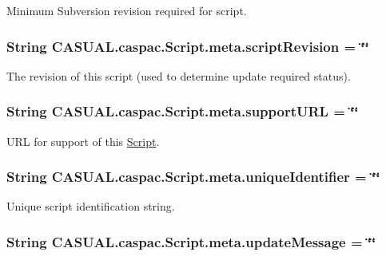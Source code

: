 Minimum Subversion revision required for script. \hypertarget{class_c_a_s_u_a_l_1_1caspac_1_1_script_1_1meta_a57752ff86ad97dc0123eaae1555dbfd5}{
\subsubsection[{script\-Revision}]{\setlength{\rightskip}{0pt plus 5cm}String C\-A\-S\-U\-A\-L.\-caspac.\-Script.\-meta.\-script\-Revision = \char`\"{}\char`\"{}}}\label{class_c_a_s_u_a_l_1_1caspac_1_1_script_1_1meta_a57752ff86ad97dc0123eaae1555dbfd5}
The revision of this script (used to determine update required status). \hypertarget{class_c_a_s_u_a_l_1_1caspac_1_1_script_1_1meta_ac61f54a156af56a97ddebc1b97c6de02}{
\subsubsection[{support\-U\-R\-L}]{\setlength{\rightskip}{0pt plus 5cm}String C\-A\-S\-U\-A\-L.\-caspac.\-Script.\-meta.\-support\-U\-R\-L = \char`\"{}\char`\"{}}}\label{class_c_a_s_u_a_l_1_1caspac_1_1_script_1_1meta_ac61f54a156af56a97ddebc1b97c6de02}
U\-R\-L for support of this \hyperlink{class_c_a_s_u_a_l_1_1caspac_1_1_script}{Script}. \hypertarget{class_c_a_s_u_a_l_1_1caspac_1_1_script_1_1meta_a66b81ac4a19e9bcd67f13776d05c03e9}{
\subsubsection[{unique\-Identifier}]{\setlength{\rightskip}{0pt plus 5cm}String C\-A\-S\-U\-A\-L.\-caspac.\-Script.\-meta.\-unique\-Identifier = \char`\"{}\char`\"{}}}\label{class_c_a_s_u_a_l_1_1caspac_1_1_script_1_1meta_a66b81ac4a19e9bcd67f13776d05c03e9}
Unique script identification string. \hypertarget{class_c_a_s_u_a_l_1_1caspac_1_1_script_1_1meta_a0a8a286ab3eb83b8a208b20f43ae4f79}{
\subsubsection[{update\-Message}]{\setlength{\rightskip}{0pt plus 5cm}String C\-A\-S\-U\-A\-L.\-caspac.\-Script.\-meta.\-update\-Message = \char`\"{}\char`\"{}}}\label{class_c_a_s_u_a_l_1_1caspac_1_1_script_1_1meta_a0a8a286ab3eb83b8a208b20f43ae4f79}

